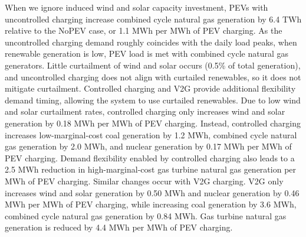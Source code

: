 \documentclass[9pt,twocolumn,twoside,lineno]{pnas-new}
\begin{document}
When we ignore induced wind and solar capacity investment, PEVs with uncontrolled charging increase combined cycle natural gas generation by 6.4 TWh relative to the NoPEV case, or 1.1 MWh per MWh of PEV charging. As the uncontrolled charging demand roughly coincides with the daily load peaks, when renewable generation is low, PEV load is met with combined cycle natural gas generators. Little curtailment of wind and solar occurs (0.5\% of total generation), and uncontrolled charging does not align with curtailed renewables, so it does not mitigate curtailment. Controlled charging and V2G provide additional flexibility demand timing, allowing the system to use curtailed renewables. Due to low wind and solar curtailment rates, controlled charging only increases wind and solar generation by 0.18 MWh per MWh of PEV charging. Instead, controlled charging increases low-marginal-cost coal generation by 1.2 MWh, combined cycle natural gas generation by 2.0 MWh, and nuclear generation by 0.17 MWh per MWh of PEV charging. Demand flexibility enabled by controlled charging also leads to a 2.5 MWh reduction in high-marginal-cost gas turbine natural gas generation per MWh of PEV charging. Similar changes occur with V2G charging. V2G only increases wind and solar generation by 0.50 MWh and nuclear generation by 0.46 MWh per MWh of PEV charging, while increasing coal generation by 3.6 MWh, combined cycle natural gas generation by 0.84 MWh. Gas turbine natural gas generation is reduced by 4.4 MWh per MWh of PEV charging. 
\end{document}
